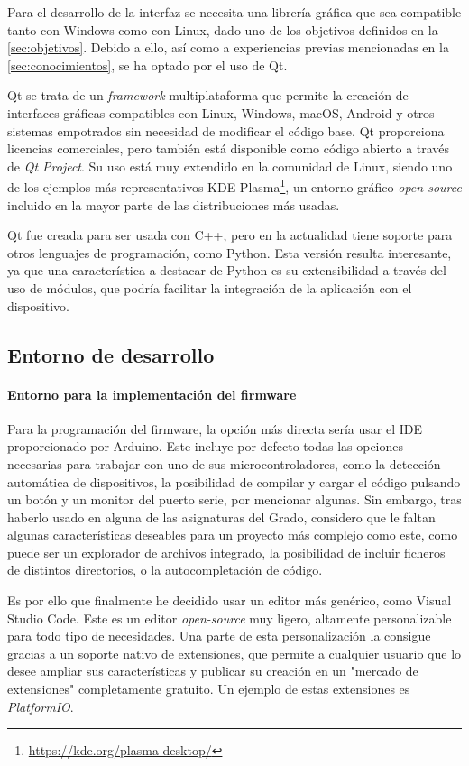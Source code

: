 Para el desarrollo de la interfaz se necesita una librería gráfica que sea compatible tanto con Windows como con Linux, dado uno de los objetivos definidos en la \autoref{sec:objetivos}. Debido a ello, así como a experiencias previas mencionadas en la \autoref{sec:conocimientos}, se ha optado por el uso de Qt.

Qt se trata de un \textit{framework} multiplataforma que permite la creación de interfaces gráficas compatibles con Linux, Windows, macOS, Android y otros sistemas empotrados sin necesidad de modificar el código base. Qt proporciona licencias comerciales, pero también está disponible como código abierto a través de \emph{Qt Project}. Su uso está muy extendido en la comunidad de Linux, siendo uno de los ejemplos más representativos KDE Plasma\footnote{\url{https://kde.org/plasma-desktop/}}, un entorno gráfico \textit{open-source} incluido en la mayor parte de las distribuciones más usadas.

Qt fue creada para ser usada con C++, pero en la actualidad tiene soporte para otros lenguajes de programación, como Python. Esta versión resulta interesante, ya que una característica a destacar de Python es su extensibilidad a través del uso de módulos, que podría facilitar la integración de la aplicación con el dispositivo.

\subsection{Entorno de desarrollo}

\paragraph{Entorno para la implementación del firmware}

Para la programación del firmware, la opción más directa sería usar el IDE proporcionado por Arduino. Este incluye por defecto todas las opciones necesarias para trabajar con uno de sus microcontroladores, como la detección automática de dispositivos, la posibilidad de compilar y cargar el código pulsando un botón y un monitor del puerto serie, por mencionar algunas. Sin embargo, tras haberlo usado en alguna de las asignaturas del Grado, considero que le faltan algunas características deseables para un proyecto más complejo como este, como puede ser un explorador de archivos integrado, la posibilidad de incluir ficheros de distintos directorios, o la autocompletación de código.

Es por ello que finalmente he decidido usar un editor más genérico, como Visual Studio Code. Este es un editor \textit{open-source} muy ligero, altamente personalizable para todo tipo de necesidades. Una parte de esta personalización la consigue gracias a un soporte nativo de extensiones, que permite a cualquier usuario que lo desee ampliar sus características y publicar su creación en un "mercado de extensiones" completamente gratuito. Un ejemplo de estas extensiones es \textit{PlatformIO}.

